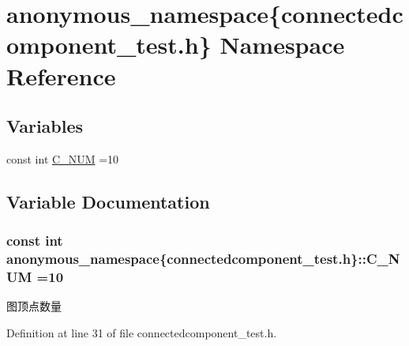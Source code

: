 \hypertarget{namespaceanonymous__namespace_02connectedcomponent__test_8h_03}{}\section{anonymous\+\_\+namespace\{connectedcomponent\+\_\+test.\+h\} Namespace Reference}
\label{namespaceanonymous__namespace_02connectedcomponent__test_8h_03}
\subsection*{Variables}
\begin{DoxyCompactItemize}
\item 
const int \hyperlink{namespaceanonymous__namespace_02connectedcomponent__test_8h_03_a7b2ff10fde75f8ca30157d6bd9c9444a}{C\+\_\+\+N\+U\+M} =10
\end{DoxyCompactItemize}


\subsection{Variable Documentation}
\hypertarget{namespaceanonymous__namespace_02connectedcomponent__test_8h_03_a7b2ff10fde75f8ca30157d6bd9c9444a}{}
\subsubsection[{C\+\_\+\+N\+U\+M}]{\setlength{\rightskip}{0pt plus 5cm}const int anonymous\+\_\+namespace\{connectedcomponent\+\_\+test.\+h\}\+::C\+\_\+\+N\+U\+M =10}\label{namespaceanonymous__namespace_02connectedcomponent__test_8h_03_a7b2ff10fde75f8ca30157d6bd9c9444a}
图顶点数量 

Definition at line 31 of file connectedcomponent\+\_\+test.\+h.

